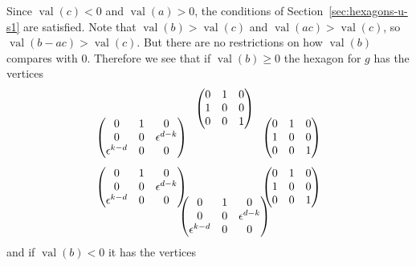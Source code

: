 \documentclass{amsart}
\theoremstyle{definition}
\def\e{\epsilon}
\def\val{\mathop{\mathrm{val}}}
\def\heximages#1#2#3#4#5#6{
  \heximagessqueezedcarefully{1.7em}{-1em}{#1}{#2}{#3}{#4}{#5}{#6}
}
\def\heximagessqueezedcarefully#1#2#3#4#5#6#7#8{
  \begin{array}{ccc}
    & #3 & \\[#2]
    #5 \hspace{-#1} & & \hspace{-#1} #4 \\[2em]
    #6 \hspace{-#1} & & \hspace{-#1} #7 \\[#2]
    & #8 &
  \end{array}
}
\begin{document}
  Since $\val(c) < 0$ and $\val(a) > 0$, the conditions of
  Section~\ref{sec:hexagons-u-s1} are satisfied.  Note that $\val(b) > \val(c)$
  and $\val(ac) > \val(c)$, so $\val(b-ac) > \val(c)$.  But there are no
  restrictions on how $\val(b)$ compares with $0$.  Therefore we see that
  if $\val(b) \ge 0$ the hexagon for $g$ has the vertices
  \begin{equation}
    \label{eq:2-f-max-d-min-s1-hex1}
    \heximages
       {\begin{pmatrix}
           0 & 1 & 0 \\
           1 & 0 & 0 \\
           0 & 0 & 1
       \end{pmatrix}}
       {\begin{pmatrix}
           0 & 1 & 0 \\
           1 & 0 & 0 \\
           0 & 0 & 1
       \end{pmatrix}}
       {\begin{pmatrix}
           0 & 1 & 0 \\
           0 & 0 & \e^{d-k} \\
           \e^{k-d} & 0 & 0
       \end{pmatrix}}
       {\begin{pmatrix}
           0 & 1 & 0 \\
           0 & 0 & \e^{d-k} \\
           \e^{k-d} & 0 & 0
       \end{pmatrix}}
       {\begin{pmatrix}
           0 & 1 & 0 \\
           1 & 0 & 0 \\
           0 & 0 & 1
       \end{pmatrix}}
       {\begin{pmatrix}
           0 & 1 & 0 \\
           0 & 0 & \e^{d-k} \\
           \e^{k-d} & 0 & 0
       \end{pmatrix}}
  \end{equation}
  and if $\val(b) < 0$ it has the vertices
\end{document}
